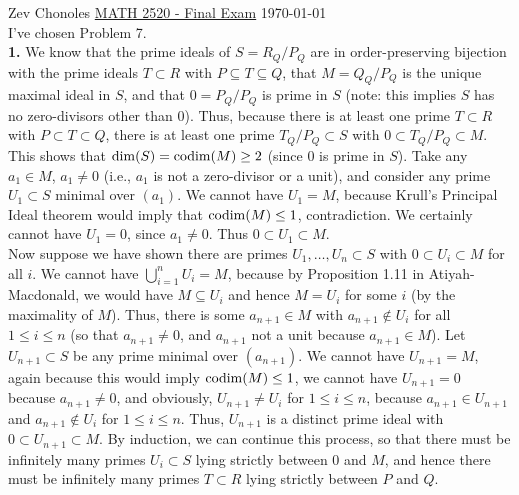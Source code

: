 \documentclass[11pt]{article}
\begin{document}
Zev Chonoles \hfill 
\underline{MATH 2520 - Final Exam} \hfill \today\\

I've chosen Problem 7.\\

{\sf\textbf{1.}} We know that the prime ideals of $S=R_Q/P_Q$ are in order-preserving bijection with the prime ideals $T\subset R$ with $P\subseteq T\subseteq Q$, that $M=Q_Q/P_Q$ is the unique maximal ideal in $S$, and that $0=P_Q/P_Q$ is prime in $S$ (note: this implies $S$ has no zero-divisors other than 0). Thus, because there is at least one prime $T\subset R$ with $P\subset T\subset Q$, there is at least one prime $T_Q/P_Q\subset S$ with $0\subset T_Q/P_Q\subset M$. This shows that $\operatorname{dim}(S)=\operatorname{codim}(M)\geq 2$ (since 0 is prime in $S$). Take any $a_1\in M$, $a_1\neq 0$ (i.e., $a_1$ is not a zero-divisor or a unit), and consider any prime $U_1\subset S$ minimal over $(a_1)$. We cannot have $U_1=M$, because Krull's Principal Ideal theorem would imply that $\operatorname{codim}(M)\leq 1$, contradiction. We certainly cannot have $U_1=0$, since $a_1\neq 0$. Thus $0\subset U_1\subset M$. \\

Now suppose we have shown there are primes $U_1,\ldots,U_n\subset S$ with $0\subset U_i\subset M$ for all $i$. We cannot have $\bigcup_{i=1}^n U_i=M$, because by Proposition 1.11 in Atiyah-Macdonald, we would have $M\subseteq U_i$ and hence $M=U_i$ for some $i$ (by the maximality of $M$). Thus, there is some $a_{n+1}\in M$ with $a_{n+1}\notin U_i$ for all $1\leq i\leq n$ (so that $a_{n+1}\neq0$, and $a_{n+1}$ not a unit because $a_{n+1}\in M$). Let $U_{n+1}\subset S$ be any prime minimal over $(a_{n+1})$. We cannot have $U_{n+1}=M$, again because this would imply $\operatorname{codim}(M)\leq 1$, we cannot have $U_{n+1}=0$ because $a_{n+1}\neq0$, and obviously, $U_{n+1}\neq U_i$ for $1\leq i\leq n$, because $a_{n+1}\in U_{n+1}$ and $a_{n+1}\notin U_i$ for $1\leq i\leq n$. Thus, $U_{n+1}$ is a distinct prime ideal with $0\subset U_{n+1}\subset M$. By induction, we can continue this process, so that there must be infinitely many primes $U_i\subset S$ lying strictly between 0 and $M$, and hence there must be infinitely many primes $T\subset R$ lying strictly between $P$ and $Q$. \\
\end{document}
